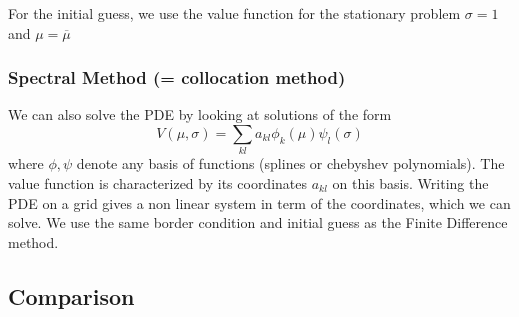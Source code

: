 \documentclass[english]{article}
\begin{document}
For the initial guess, we use the value function for the stationary problem $\sigma = 1$ and $\mu = \overline{\mu}$

\subsubsection{Spectral Method (= collocation method)}
We can also solve the PDE by looking at solutions of the form
$$V(\mu, \sigma) = \sum_{kl} a_{kl} \phi_k(\mu)\psi_l(\sigma)$$
where $\phi, \psi$ denote any basis of functions (splines or chebyshev polynomials).
The value function is characterized by its coordinates $a_{kl}$ on this basis. Writing the PDE on a grid gives a non linear system in term of the coordinates, which we can solve. We use the same border condition and initial guess as the Finite Difference method.

\subsection{Comparison}
\end{document}
